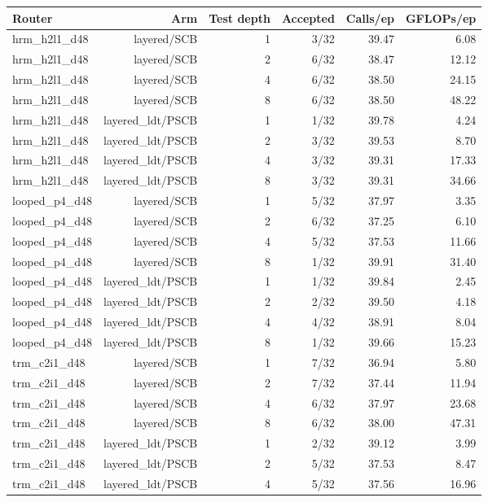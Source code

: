 \begin{table}[t]
\centering
\small
\begin{adjustbox}{max width=\linewidth}
\begin{tabular}{lrrrrr}
\toprule
Router & Arm & Test depth & Accepted & Calls/ep & GFLOPs/ep \\
\midrule
hrm\_h2l1\_d48 & layered/SCB & 1 & 3/32 & 39.47 & 6.08 \\
hrm\_h2l1\_d48 & layered/SCB & 2 & 6/32 & 38.47 & 12.12 \\
hrm\_h2l1\_d48 & layered/SCB & 4 & 6/32 & 38.50 & 24.15 \\
hrm\_h2l1\_d48 & layered/SCB & 8 & 6/32 & 38.50 & 48.22 \\
hrm\_h2l1\_d48 & layered\_ldt/PSCB & 1 & 1/32 & 39.78 & 4.24 \\
hrm\_h2l1\_d48 & layered\_ldt/PSCB & 2 & 3/32 & 39.53 & 8.70 \\
hrm\_h2l1\_d48 & layered\_ldt/PSCB & 4 & 3/32 & 39.31 & 17.33 \\
hrm\_h2l1\_d48 & layered\_ldt/PSCB & 8 & 3/32 & 39.31 & 34.66 \\
looped\_p4\_d48 & layered/SCB & 1 & 5/32 & 37.97 & 3.35 \\
looped\_p4\_d48 & layered/SCB & 2 & 6/32 & 37.25 & 6.10 \\
looped\_p4\_d48 & layered/SCB & 4 & 5/32 & 37.53 & 11.66 \\
looped\_p4\_d48 & layered/SCB & 8 & 1/32 & 39.91 & 31.40 \\
looped\_p4\_d48 & layered\_ldt/PSCB & 1 & 1/32 & 39.84 & 2.45 \\
looped\_p4\_d48 & layered\_ldt/PSCB & 2 & 2/32 & 39.50 & 4.18 \\
looped\_p4\_d48 & layered\_ldt/PSCB & 4 & 4/32 & 38.91 & 8.04 \\
looped\_p4\_d48 & layered\_ldt/PSCB & 8 & 1/32 & 39.66 & 15.23 \\
trm\_c2i1\_d48 & layered/SCB & 1 & 7/32 & 36.94 & 5.80 \\
trm\_c2i1\_d48 & layered/SCB & 2 & 7/32 & 37.44 & 11.94 \\
trm\_c2i1\_d48 & layered/SCB & 4 & 6/32 & 37.97 & 23.68 \\
trm\_c2i1\_d48 & layered/SCB & 8 & 6/32 & 38.00 & 47.31 \\
trm\_c2i1\_d48 & layered\_ldt/PSCB & 1 & 2/32 & 39.12 & 3.99 \\
trm\_c2i1\_d48 & layered\_ldt/PSCB & 2 & 5/32 & 37.53 & 8.47 \\
trm\_c2i1\_d48 & layered\_ldt/PSCB & 4 & 5/32 & 37.56 & 16.96 \\

\end{tabular}
\end{adjustbox}
\end{table}
